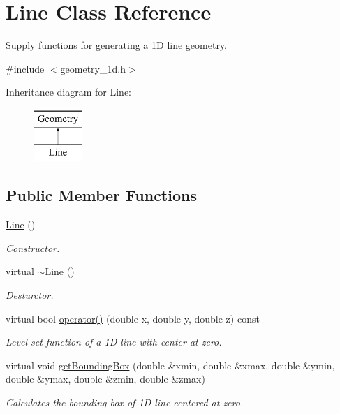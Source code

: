\hypertarget{classLine}{\section{Line Class Reference}
\label{classLine}
}


Supply functions for generating a 1\-D line geometry.  




{\ttfamily \#include $<$geometry\-\_\-1d.\-h$>$}

Inheritance diagram for Line\-:\begin{figure}[H]
\begin{center}
\leavevmode
\includegraphics[height=2.000000cm]{classLine}
\end{center}
\end{figure}
\subsection*{Public Member Functions}
\begin{DoxyCompactItemize}
\item 
\hyperlink{classLine_acc11b8a429d8cdd63ba6803dff5602b3}{Line} ()
\begin{DoxyCompactList}\small\item\em Constructor. \end{DoxyCompactList}\item 
\hypertarget{classLine_a4a95bafcefa28672b3999deb011b9e50}{virtual \hyperlink{classLine_a4a95bafcefa28672b3999deb011b9e50}{$\sim$\-Line} ()}\label{classLine_a4a95bafcefa28672b3999deb011b9e50}

\begin{DoxyCompactList}\small\item\em Desturctor. \end{DoxyCompactList}\item 
virtual bool \hyperlink{classLine_ae395e361d24c5d3213e3fdd3d60dfd0d}{operator()} (double x, double y, double z) const 
\begin{DoxyCompactList}\small\item\em Level set function of a 1\-D line with center at zero. \end{DoxyCompactList}\item 
virtual void \hyperlink{classLine_a69b59bf7fc0b65301b4178280278dc64}{get\-Bounding\-Box} (double \&xmin, double \&xmax, double \&ymin, double \&ymax, double \&zmin, double \&zmax)
\begin{DoxyCompactList}\small\item\em Calculates the bounding box of 1\-D line centered at zero. \end{DoxyCompactList}\end{DoxyCompactItemize}



